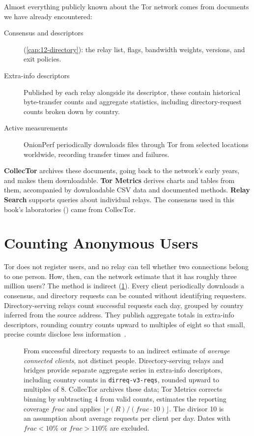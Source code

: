 Almost everything publicly known about the Tor network comes from documents we have already encountered:
\begin{description}
  \item[Consensus and descriptors] (\cref{cap:12-directory}): the relay list, flags, bandwidth weights, versions, and exit policies.
  \item[Extra-info descriptors] Published by each relay alongside its descriptor, these contain historical byte-transfer counts and aggregate statistics, including directory-request counts broken down by country.
  \item[Active measurements] OnionPerf periodically downloads files through Tor from selected locations worldwide, recording transfer times and failures.
\end{description}
\textbf{CollecTor} archives these documents, going back to the network's early years, and makes them downloadable. \textbf{Tor Metrics} derives charts and tables from them, accompanied by downloadable CSV data and documented methods. \textbf{Relay Search} supports queries about individual relays. The consensus used in this book's laboratories () came from CollecTor.

\section{Counting Anonymous Users}\label{sec:metrics-utenti}

Tor does not register users, and no relay can tell whether two connections belong to one person. How, then, can the network estimate that it has roughly three million users? The method is indirect (\cref{fig:stima}). Every client periodically downloads a consensus, and directory requests can be counted without identifying requesters. Directory-serving relays count successful requests each day, grouped by country inferred from the source address. They publish aggregate totals in extra-info descriptors, rounding country counts upward to multiples of eight so that small, precise counts disclose less information~.

\begin{figure}[htbp]
\centering

\caption{From successful directory requests to an indirect estimate of \emph{average connected clients}, not distinct people. Directory-serving relays and bridges provide separate aggregate series in extra-info descriptors, including country counts in \texttt{dirreq-v3-reqs}, rounded upward to multiples of 8. CollecTor archives these data; Tor Metrics corrects binning by subtracting 4 from valid counts, estimates the reporting coverage $\mathit{frac}$ and applies $\lfloor r(R)/(\mathit{frac}\cdot10)\rfloor$. The divisor 10 is an assumption about average requests per client per day. Dates with $\mathit{frac}<10\%$ or $\mathit{frac}>110\%$ are excluded.}
\label{fig:stima}
\end{figure}

